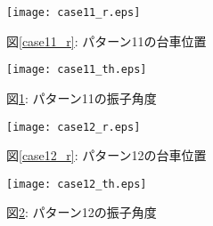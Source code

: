 \begin{figure}[htbp]
    \begin{minipage}{0.5\hsize}
        \begin{center}
            \texttt{[image: case11\_r.eps]}
            \caption{図\ref{case11_r}: パターン11の台車位置}
            \label{case10_r}
        \end{center}
    \end{minipage}
    \begin{minipage}{0.5\hsize}
        \begin{center}
            \texttt{[image: case11\_th.eps]}
            \caption{図\ref{case11_th}: パターン11の振子角度}
            \label{case11_th}
        \end{center}
    \end{minipage}
\end{figure}

\begin{figure}[htbp]
    \begin{minipage}{0.5\hsize}
        \begin{center}
            \texttt{[image: case12\_r.eps]}
            \caption{図\ref{case12_r}: パターン12の台車位置}
            \label{case12_r}
        \end{center}
    \end{minipage}
    \begin{minipage}{0.5\hsize}
        \begin{center}
            \texttt{[image: case12\_th.eps]}
            \caption{図\ref{case12_th}: パターン12の振子角度}
            \label{case12_th}
        \end{center}
    \end{minipage}
\end{figure}

